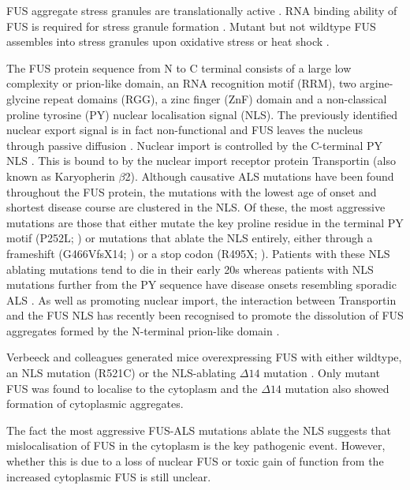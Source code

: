 FUS aggregate stress granules are translationally active \citep{Yasuda2013}.
RNA binding ability of FUS is required for stress granule formation \citep{Daigle2013}.
Mutant but not wildtype FUS assembles into stress granules upon oxidative stress or heat shock \citep{Bosco2010}.



The FUS protein sequence from N to C terminal consists of a large low complexity or prion-like domain, an RNA recognition motif (RRM), two argine-glycine repeat domains (RGG), a zinc finger (ZnF) domain and a  non-classical proline tyrosine (PY) nuclear localisation signal (NLS). 
The previously identified nuclear export signal is in fact non-functional and FUS leaves the nucleus through passive diffusion \citep{Ederle2018}. 
Nuclear import is controlled by the C-terminal PY NLS \citep{Dormann2010}. This is bound to by the nuclear import receptor protein Transportin (also known as Karyopherin $\beta$2).
Although causative ALS mutations have been found throughout the FUS protein, the mutations with the lowest age of onset and shortest disease course are clustered in the NLS. 
Of these, the most aggressive mutations are those that either mutate the key proline residue in the terminal PY motif (P252L; \citep{Chio2009}) or mutations that ablate the NLS entirely, either through a frameshift (G466VfsX14; \citep{DeJesus-Hernandez2010}) or a stop codon (R495X; \citep{Bosco2010}). 
Patients with these NLS ablating mutations tend to die in their early 20s whereas patients with NLS mutations further from the PY sequence have disease onsets resembling sporadic ALS \citep{Shang2016}.
As well as promoting nuclear import, the interaction between Transportin and the FUS NLS has recently been recognised to promote the dissolution of FUS aggregates formed by the N-terminal prion-like domain \citep{Guo2018, Yoshizawa2018}.

Verbeeck and colleagues generated mice overexpressing FUS with either wildtype, an NLS mutation (R521C) or the NLS-ablating $\Delta14$ mutation \cite{Verbeeck2012}. Only mutant FUS was found to localise to the cytoplasm and the $\Delta14$ mutation also showed formation of cytoplasmic aggregates. 

The fact the most aggressive FUS-ALS mutations ablate the NLS suggests that mislocalisation of FUS in the cytoplasm is the key pathogenic event. However, whether this is due to a loss of nuclear FUS or toxic gain of function from the increased cytoplasmic FUS is still unclear.

